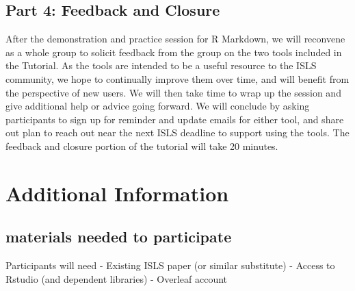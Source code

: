 \documentclass{article}
\begin{document}



\subsection{Part 4: Feedback and Closure}
After the demonstration and practice session for R Markdown, we will reconvene as a whole group to solicit feedback from the group on the two tools included in the Tutorial. As the tools are intended to be a useful resource to the ISLS community, we hope to continually improve them over time, and will benefit from the perspective of new users. We will then take time to wrap up the session and give additional help or advice going forward. We will conclude by asking participants to sign up for reminder and update emails for either tool, and share out plan to reach out near the next ISLS deadline to support using the tools. The feedback and closure portion of the tutorial will take 20 minutes.



\section{Additional Information}
\subsection{materials needed to participate}
Participants will need
	- Existing ISLS paper (or similar substitute)
	- Access to Rstudio (and dependent libraries)
	- Overleaf account
\end{document}
